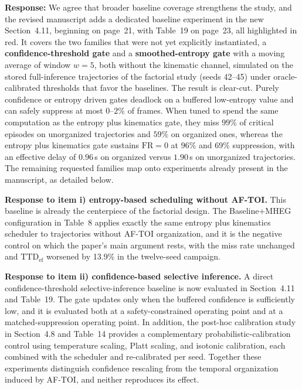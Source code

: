\documentclass[1p,12pt,authoryear]{elsarticle}
\begin{document}
\vspace{2mm}
\noindent \textbf{Response:} We agree that broader baseline coverage strengthens the study, and the revised manuscript adds a dedicated baseline experiment in the new Section~4.11, beginning on page~21, with Table~19 on page~23, all highlighted in red. It covers the two families that were not yet explicitly instantiated, a \textbf{confidence-threshold gate} and a \textbf{smoothed-entropy gate} with a moving average of window $w{=}5$, both without the kinematic channel, simulated on the stored full-inference trajectories of the factorial study (seeds 42--45) under oracle-calibrated thresholds that favor the baselines. The result is clear-cut. Purely confidence or entropy driven gates deadlock on a buffered low-entropy value and can safely suppress at most $0$--$2\%$ of frames. When tuned to spend the same computation as the entropy plus kinematics gate, they miss $99\%$ of critical episodes on unorganized trajectories and $59\%$ on organized ones, whereas the entropy plus kinematics gate sustains $\mathrm{FR}=0$ at $96\%$ and $69\%$ suppression, with an effective delay of $0.96$\,s on organized versus $1.90$\,s on unorganized trajectories. The remaining requested families map onto experiments already present in the manuscript, as detailed below.

\vspace{2mm}
\noindent \textbf{Response to item i) entropy-based scheduling without AF-TOI.} This baseline is already the centerpiece of the factorial design. The Baseline+MHEG configuration in Table~8 applies exactly the same entropy plus kinematics scheduler to trajectories without AF-TOI organization, and it is the negative control on which the paper's main argument rests, with the miss rate unchanged and $\mathrm{TTD}_{\mathrm{ef}}$ worsened by 13.9\% in the twelve-seed campaign.

\vspace{2mm}
\noindent \textbf{Response to item ii) confidence-based selective inference.} A direct confidence-threshold selective-inference baseline is now evaluated in Section~4.11 and Table~19. The gate updates only when the buffered confidence is sufficiently low, and it is evaluated both at a safety-constrained operating point and at a matched-suppression operating point. In addition, the post-hoc calibration study in Section~4.8 and Table~14 provides a complementary probabilistic-calibration control using temperature scaling, Platt scaling, and isotonic calibration, each combined with the scheduler and re-calibrated per seed. Together these experiments distinguish confidence rescaling from the temporal organization induced by AF-TOI, and neither reproduces its effect.
\end{document}
